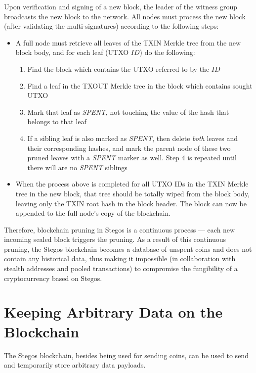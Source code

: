 \documentclass[a4paper, 10pt, conference]{ieeeconf}
\begin{document}
Upon verification and signing of a new block, the leader of the witness group broadcasts the new block to the network. All nodes must process the new block (after validating the multi-signatures) according to the following steps:

\begin{itemize}
	\item {A full node must retrieve all leaves of the TXIN Merkle tree from the new block body, and for each leaf (UTXO $ID$) do the following:
	\begin{enumerate}
		\item {Find the block which contains the UTXO referred to by the $ID$}
		   \item {Find a leaf in the TXOUT Merkle tree in the block which contains sought UTXO}
		\item {Mark that leaf as \textit{SPENT}, not touching the value of the hash that belongs to that leaf}
		\item {If a sibling leaf is also marked as \textit{SPENT}, then delete \textit{both} leaves and their corresponding hashes, and mark the parent node of these two pruned leaves with a \textit{SPENT} marker as well. Step 4 is repeated until there will are no \textit{SPENT} siblings}
	\end{enumerate}} 
	\item {When the process above is completed for all UTXO IDs in the TXIN Merkle tree in the new block, that tree should be totally wiped from the block body, leaving only the TXIN root hash in the block header. The block can now be appended to the full node's copy of the blockchain.}
\end{itemize}

Therefore, blockchain pruning in Stegos is a continuous process --- each new incoming sealed block triggers the pruning. As a result of this continuous pruning, the Stegos blockchain becomes a database of unspent coins and does not contain any historical data, thus making it impossible (in collaboration with stealth addresses and pooled transactions) to compromise the fungibility of a cryptocurrency based on Stegos.

\section{Keeping Arbitrary Data on the Blockchain} \label{data}

The Stegos blockchain, besides being used for sending coins, can be used to send and temporarily store arbitrary data payloads. 
\end{document}
